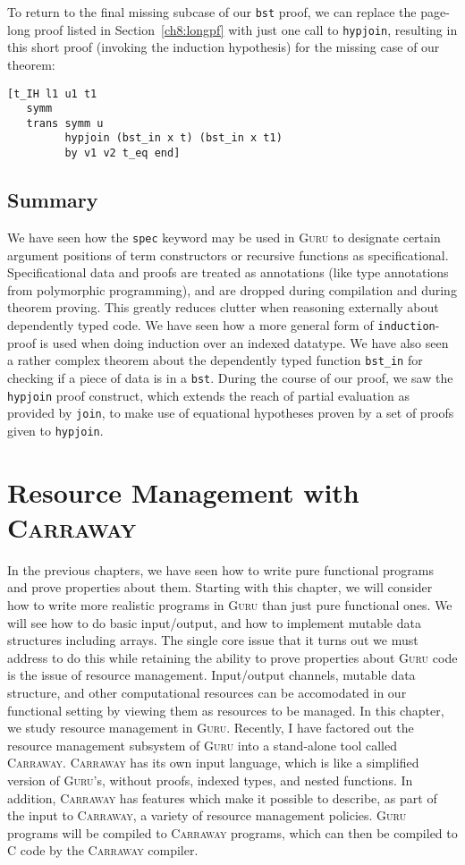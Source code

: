 \documentclass{book}[12pt]
\newcommand{\guru}[0]{\textsc{Guru}\xspace}
\newcommand{\carraway}[0]{\textsc{Carraway}\xspace}
\begin{document}
To return to the final missing subcase of our \texttt{bst} proof, we
can replace the page-long proof listed in Section~\ref{ch8:longpf}
with just one call to \texttt{hypjoin}, resulting in this short proof
(invoking the induction hypothesis) for the missing case of our
theorem:

\begin{verbatim}
[t_IH l1 u1 t1 
   symm
   trans symm u
         hypjoin (bst_in x t) (bst_in x t1)
         by v1 v2 t_eq end]
\end{verbatim}

\section{Summary}

We have seen how the \texttt{spec} keyword may be used in \guru to
designate certain argument positions of term constructors or recursive
functions as specificational.  Specificational data and proofs are
treated as annotations (like type annotations from polymorphic
programming), and are dropped during compilation and during theorem
proving.  This greatly reduces clutter when reasoning externally about
dependently typed code.  We have seen how a more general form of
\texttt{induction}-proof is used when doing induction over an indexed
datatype.  We have also seen a rather complex theorem about the
dependently typed function \texttt{bst\_in} for checking if a piece of
data is in a \texttt{bst}.  During the course of our proof, we saw the
\texttt{hypjoin} proof construct, which extends the reach of partial
evaluation as provided by \texttt{join}, to make use of equational
hypotheses proven by a set of proofs given to \texttt{hypjoin}.

\chapter{Resource Management with \carraway}

In the previous chapters, we have seen how to write pure functional
programs and prove properties about them.  Starting with this chapter,
we will consider how to write more realistic programs in \guru than
just pure functional ones.  We will see how to do basic input/output,
and how to implement mutable data structures including arrays.  The
single core issue that it turns out we must address to do this while
retaining the ability to prove properties about \guru code is the
issue of resource management.  Input/output channels, mutable data
structure, and other computational resources can be accomodated in our
functional setting by viewing them as resources to be managed.  In
this chapter, we study resource management in \guru.  Recently, I have
factored out the resource management subsystem of \guru into a
stand-alone tool called \carraway.  \carraway has its own input
language, which is like a simplified version of \guru's, without
proofs, indexed types, and nested functions.  In addition, \carraway
has features which make it possible to describe, as part of the input
to \carraway, a variety of resource management policies.  \guru
programs will be compiled to \carraway programs, which can then be
compiled to C code by the \carraway compiler.
\end{document}
